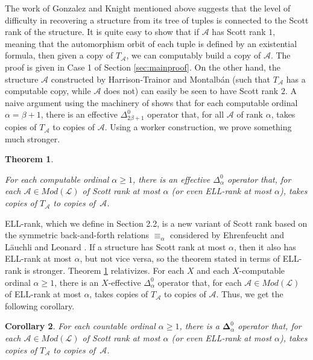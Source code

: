 \documentclass{article}
\newcommand{\ELL}{\textnormal{ELL}}
\newcommand{\bfDelta}{\boldsymbol{\Delta}}
\newtheorem{thm}{Theorem}[section]
\newtheorem{cor}[thm]{Corollary}
\theoremstyle{definition}
\begin{document}
	The work of Gonzalez and Knight \cite{GonzalezKnight} mentioned above suggests that the level of difficulty in recovering a structure from its tree of tuples is connected to the Scott rank of the structure. It is quite easy to show that if $\mathcal{A}$ has Scott rank $1$, meaning that the automorphism orbit of each tuple is defined by an existential formula, then given a copy of $T_\mathcal{A}$, we can computably build a copy of $\mathcal{A}$. The proof is given in Case 1 of Section \ref{sec:mainproof}. On the other hand, the structure $\mathcal{A}$ constructed by Harrison-Trainor and Montalb\'an (such that $T_\mathcal{A}$ has a computable copy, while $\mathcal{A}$ does not) can easily be seen to have Scott rank $2$. A naive argument using the machinery of \cite{GonzalezKnight} shows that for each computable ordinal $\alpha = \beta+1$, there is an effective $\Delta^0_{2\beta+1}$ operator that, for all $\mathcal{A}$ of rank $\alpha$, takes copies of $T_\mathcal{A}$ to copies of $\mathcal{A}$. Using a worker construction, we prove something much stronger.
	
	\begin{thm}	\label{Bounding}
		
		For each computable ordinal $\alpha\geq 1$, there is an effective $\Delta^0_\alpha$ operator that, for each $\mathcal{A}\in Mod(\mathcal{L})$ of Scott rank at most $\alpha$ (or even \ELL-rank at most $\alpha$), takes copies of $T_\mathcal{A}$ to copies of~$\mathcal{A}$.
	\end{thm}
	
	\ELL-rank, which we define in Section 2.2, is a new variant of Scott rank based on the symmetric back-and-forth relations $\equiv_\alpha$ considered by Ehrenfeucht \cite{Ehrenfeucht} and L\"{a}uchli and Leonard \cite{Lauchli}. If a structure has Scott rank at most $\alpha$, then it also has \ELL-rank at most $\alpha$, but not vice versa, so the theorem stated in terms of \ELL-rank is stronger. 
	Theorem \ref{Bounding} relativizes. For each $X$ and each $X$-computable ordinal $\alpha\geq 1$, there is an $X$-effective $\Delta^0_\alpha$ operator that, for each $\mathcal{A}\in Mod(\mathcal{L})$ of \ELL-rank at most $\alpha$, takes copies of $T_\mathcal{A}$ to copies of $\mathcal{A}$. Thus, we get the following corollary.
	
	\begin{cor}
		For each countable ordinal $\alpha\geq 1$, there is a $\bfDelta^0_\alpha$ operator that, for each $\mathcal{A}\in Mod(\mathcal{L})$ of Scott rank at most $\alpha$ (or even \ELL-rank at most $\alpha$), takes copies of $T_\mathcal{A}$ to copies of~$\mathcal{A}$.
	\end{cor}
	
\end{document}
